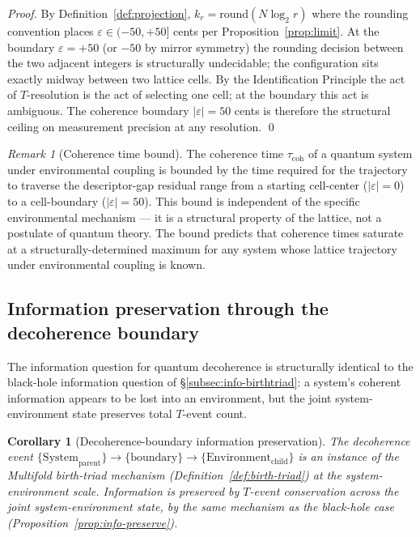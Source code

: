 \documentclass[11pt,a4paper]{article}
\newtheorem{corollary}[theorem]{Corollary}
\theoremstyle{definition}
\theoremstyle{remark}
\newtheorem{remark}[theorem]{Remark}
\begin{document}
\begin{proof}
By Definition~\ref{def:projection}, $k_{r} = \mathrm{round}(N\log_{2}r)$ where the rounding convention places $\varepsilon \in (-50, +50]$ cents per Proposition~\ref{prop:limit}. At the boundary $\varepsilon = +50$ (or $-50$ by mirror symmetry) the rounding decision between the two adjacent integers is structurally undecidable; the configuration sits exactly midway between two lattice cells. By the Identification Principle the act of $T$-resolution is the act of selecting one cell; at the boundary this act is ambiguous. The coherence boundary $|\varepsilon|=50$ cents is therefore the structural ceiling on measurement precision at any resolution. \qed
\end{proof}

\begin{remark}[Coherence time bound]\label{rem:coherence-time}
The coherence time $\tau_{\mathrm{coh}}$ of a quantum system under environmental coupling is bounded by the time required for the trajectory to traverse the descriptor-gap residual range from a starting cell-center ($|\varepsilon| = 0$) to a cell-boundary ($|\varepsilon| = 50$). This bound is independent of the specific environmental mechanism --- it is a structural property of the lattice, not a postulate of quantum theory. The bound predicts that coherence times saturate at a structurally-determined maximum for any system whose lattice trajectory under environmental coupling is known.
\end{remark}

\subsection{Information preservation through the decoherence boundary}\label{subsec:decoherence-info}

The information question for quantum decoherence is structurally identical to the black-hole information question of \S\ref{subsec:info-birthtriad}: a system's coherent information appears to be lost into an environment, but the joint system-environment state preserves total $T$-event count.

\begin{corollary}[Decoherence-boundary information preservation]\label{cor:decoherence-info}
The decoherence event $\{\text{System}_{\text{parent}}\} \to \{\text{boundary}\} \to \{\text{Environment}_{\text{child}}\}$ is an instance of the Multifold birth-triad mechanism (Definition~\ref{def:birth-triad}) at the system-environment scale. Information is preserved by $T$-event conservation across the joint system-environment state, by the same mechanism as the black-hole case (Proposition~\ref{prop:info-preserve}).
\end{corollary}
\end{document}
